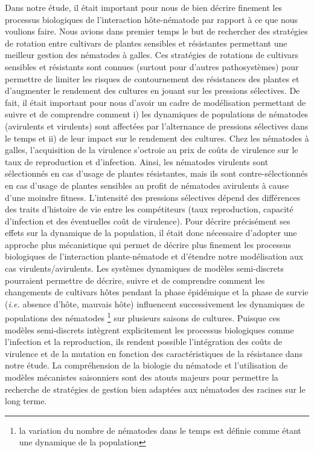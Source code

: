 	Dans notre étude, il était important pour nous de bien décrire finement les processus biologiques de l’interaction hôte-nématode  par rapport à ce que nous voulions faire. Nous avions dans premier temps le but de rechercher des stratégies de rotation entre cultivars de plantes sensibles et résistantes permettant une meilleur gestion  des nématodes à galles. Ces stratégies de rotations de cultivars sensibles et résistants sont connues (surtout pour d'autres pathosystèmes) pour permettre de limiter les risques de contournement des résistances des plantes et d'augmenter le rendement des cultures en jouant sur les pressions sélectives.  De fait, il était important pour nous d'avoir un cadre de modélisation permettant de suivre et de comprendre comment i) les dynamiques de populations de nématodes (avirulents et virulents) sont affectées par l'alternance de pressions sélectives dans le temps et ii) de leur impact sur le rendement des cultures. 
Chez les nématodes à galles, l'acquisition de la virulence s'octroie au prix de  coûts de virulence sur le taux de  reproduction et d'infection. Ainsi, les nématodes virulents sont sélectionnés en cas d'usage de plantes
résistantes, mais ils sont contre-sélectionnés en cas d'usage de plantes sensibles au profit
de nématodes avirulents à cause d'une moindre fitness.
L’intensité des pressions sélectives  dépend des différences des traits  d'histoire de vie entre les compétiteurs (taux reproduction, capacité d'infection et des éventuelles coût de virulence). Pour décrire précisément ses effets sur la dynamique de la population, il était donc nécessaire d’adopter une approche plus mécanistique qui permet de décrire plus finement les processus biologiques de l'interaction plante-nématode et d'étendre notre modélisation aux cas virulents/avirulents. 
	Les systèmes dynamiques de modèles semi-discrets pourraient permettre  de décrire, suivre et de comprendre   comment les changements de cultivars hôtes  pendant la phase épidémique  et la phase de survie (\textit{i.e.} absence d'hôte, mauvais hôte) influencent successivement les  dynamiques de populations des nématodes \footnote{la
variation du nombre de nématodes dans le temps
est définie comme étant une dynamique de la population}  sur plusieurs saisons de cultures. Puisque ces modèles semi-discrets intègrent explicitement les processus biologiques comme l'infection et la reproduction,   ils rendent possible l’intégration  des coûts de virulence et de la mutation en fonction des caractéristiques de la résistance dans notre étude. La compréhension de la biologie du nématode et l'utilisation de modèles mécanistes saisonniers  sont des atouts majeurs pour permettre la recherche de stratégies de gestion bien adaptées aux nématodes des racines sur le long terme.
	 
